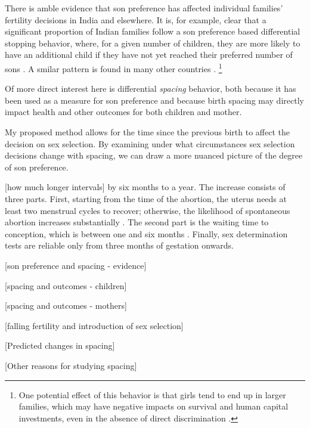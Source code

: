 There is amble evidence that son preference has affected individual families' fertility
decisions in India and elsewhere.
It is, for example, clear that a significant proportion of Indian families follow a
son preference based differential stopping behavior, where, for a given number of
children, they are more likely to have an additional child if they have not yet
reached their preferred number of sons 
\citep{repetto72,Das1987,Arnold1997,clark00,Basu2010,Barcellos2014}.
A smilar pattern is found in many other countries 
\citep[see, for example][]{larsen98,filmer09,Altindag2016}.%
\footnote{
One potential effect of this behavior is that girls tend to end up in larger families, 
which may have negative impacts on survival and human capital investments, even in 
the absence of direct discrimination \citet{Jensen2003,Kugler2017}.
}


Of more direct interest here is differential \emph{spacing} behavior, both because 
it has been used as a measure for son preference and because birth spacing may directly
impact health and other outcomes for both children and mother.










 
 
 
 
 
 






My proposed method allows for the time since the previous 
birth to affect the decision on sex selection.
By examining under what circumstances sex selection decisions change with 
spacing, we can draw a more nuanced picture of the degree of son preference.





[how much longer intervals]
 by six months to a year.
The increase consists of three parts.
First, starting from the time of the abortion, the uterus needs at 
least two menstrual cycles to recover;  otherwise, the likelihood 
of spontaneous abortion increases substantially \citep{zhou00b}.
The second part is the waiting time to conception, which is between 
one and six months \citep{Wang2003}.
Finally, sex determination tests are reliable only from three months 
of gestation onwards.











[son preference and spacing - evidence]

[spacing and outcomes - children]

[spacing and outcomes - mothers]

[falling fertility and introduction of sex selection]

[Predicted changes in spacing]

[Other reasons for studying spacing]





 
